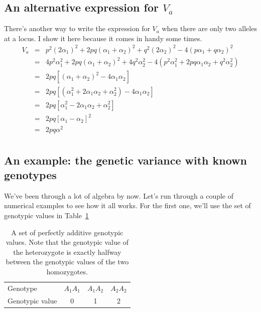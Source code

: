 \documentclass[12pt]{article}
\begin{document}
\subsection*{An alternative expression for $V_a$}

There's another way to write the expression for $V_a$ when there are
only two alleles at a locus. I show it here because it comes in handy
some times.
\begin{eqnarray*}
V_a &=& p^2(2\alpha_1)^2 + 2pq(\alpha_1+\alpha_2)^2 + q^2(2\alpha_2)^2 -
        4(p\alpha_1+q\alpha_2)^2 \\
    &=& 4p^2\alpha_1^2 + 2pq(\alpha_1+\alpha_2)^2 + 4q^2\alpha_2^2
       - 4(p^2\alpha_1^2 +2pq\alpha_1\alpha_2 + q^2\alpha_2^2) \\
    &=& 2pq[(\alpha_1+\alpha_2)^2 - 4\alpha_1\alpha_2] \\
    &=& 2pq[(\alpha_1^2 + 2\alpha_1\alpha_2 + \alpha_2^2) - 4\alpha_1\alpha_2] \\
    &=& 2pq[\alpha_1^2 - 2\alpha_1\alpha_2 + \alpha_2^2] \\
    &=& 2pq[\alpha_1 - \alpha_2]^2 \\
    &=& 2pq\alpha^2 \\
\end{eqnarray*}

\subsection*{An example: the genetic variance with known genotypes}

We've been through a lot of algebra by now. Let's run through a couple
of numerical examples to see how it all works. For the first one,
we'll use the set of genotypic values in Table~\ref{table:additive}

\begin{table}
\begin{center}
\begin{tabular}{l|ccc}
\hline\hline
Genotype        & $A_1A_1$ & $A_1A_2$ & $A_2A_2$ \\
Genotypic value &  0       & 1        & 2 \\
\hline
\end{tabular}
\end{center}
\caption{A set of perfectly additive genotypic values. Note that the
  genotypic value of the heterozygote is exactly halfway between the
  genotypic values of the two homozygotes.}\label{table:additive}
\end{table}
\end{document}
